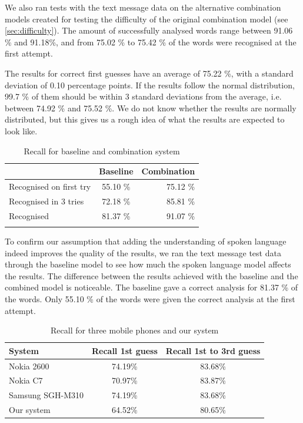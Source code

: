 \documentclass[a4paper,conference]{IEEEtran}
\begin{document}
We also ran tests with the text message data on the alternative combination models created for testing the difficulty of the original combination model (see \ref{sec:difficulty}). The amount of successfully analysed words range between 91.06 \% and 91.18\%, and from 75.02 \% to 75.42 \% of the words were recognised at the first attempt. 

The results for correct first guesses have an average of 75.22 \%, with a standard deviation of 0.10 percentage points. If the results follow the normal distribution, 99.7 \% of them should be within 3 standard deviations from the average, i.e. between 74.92 \% and 75.52 \%. We do not know whether the results are normally distributed, but this gives us a rough idea of what the results are expected to look like.

\begin{table}[!t]
\caption{Recall for baseline and combination system}
\begin{center}
\begin{tabular} {l c r}
 & Baseline & Combination \\
 \hline
Recognised on first try \rule{0pt}{2.6ex} & 55.10 \% & 75.12 \% \\
Recognised in 3 tries & 72.18 \% & 85.81 \% \\
Recognised & 81.37 \% & 91.07 \% \\
\hline
 & & \\
\end{tabular}
\end{center}
\label{tab:recall}
\end{table}


To confirm our assumption that adding the understanding of spoken language indeed improves the quality of the results, we ran the text message test data through the baseline model to see how much the spoken language model affects the results. The difference between the results achieved with the baseline and the combined model is noticeable. The baseline gave a correct analysis for 81.37 \% of the words. Only 55.10 \% of the words were given the correct analysis at the first attempt.

\begin{table}[!t]
\begin{center}
\caption{Recall for three mobile phones and our system}
\begin{tabular} {l c c}
System & Recall 1st guess & Recall 1st to 3rd guess\\
\hline
Nokia 2600 \rule{0pt}{2.6ex}  & 74.19\%          & 83.68\%\\
Nokia C7     & 70.97\%          & 83.87\%\\
Samsung SGH-M310 & 74.19\%      & 83.68\%\\
Our system & 64.52\% & 80.65\%  \\
\hline
\end{tabular}
\end{center}
\label{tab:phones}
\end{table}
\end{document}
